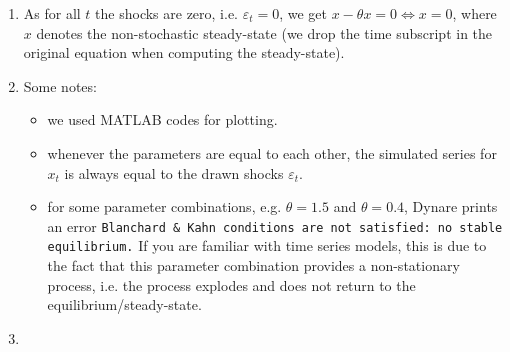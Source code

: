 \begin{enumerate}
\item As for all $t$ the shocks are zero, i.e. $\varepsilon_t = 0$, we get
  $x - \theta x = 0 \Leftrightarrow x = 0$,
  where $x$ denotes the non-stochastic steady-state
  (we drop the time subscript in the original equation when computing the steady-state).
\item 
Some notes:
\begin{itemize}
	\item we used MATLAB codes for plotting.
	\item whenever the parameters are equal to each other,
		the simulated series for $x_t$ is always equal to the drawn shocks $\varepsilon_t$.
	\item for some parameter combinations, e.g. $\theta=1.5$ and $\theta=0.4$,
		Dynare prints an error \texttt{Blanchard \& Kahn conditions are not satisfied: no stable equilibrium.}
	If you are familiar with time series models,
		this is due to the fact that this parameter combination provides a non-stationary process,
		i.e. the process explodes and does not return to the equilibrium/steady-state.
\end{itemize}

\item 
\end{enumerate}